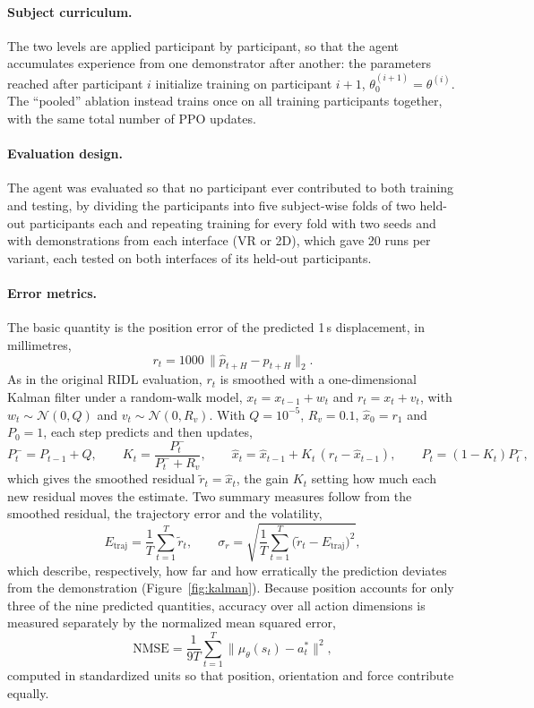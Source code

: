 \documentclass[utf8]{frontiers_suppmat}
\begin{document}
\paragraph*{Subject curriculum.} The two levels are applied participant by participant, so that the agent accumulates experience from one demonstrator after another: the parameters reached after participant $i$ initialize training on participant $i+1$, $\theta^{(i+1)}_0=\theta^{(i)}$. The ``pooled'' ablation instead trains once on all training participants together, with the same total number of PPO updates.

\paragraph*{Evaluation design.} The agent was evaluated so that no participant ever contributed to both training and testing, by dividing the participants into five subject-wise folds of two held-out participants each and repeating training for every fold with two seeds and with demonstrations from each interface (VR or 2D), which gave 20 runs per variant, each tested on both interfaces of its held-out participants.

\paragraph*{Error metrics.} The basic quantity is the position error of the predicted 1\,s displacement, in millimetres,
\begin{equation}\label{eq:err}
r_t=1000\,\big\|\hat p_{t+H}-p_{t+H}\big\|_2 .
\end{equation}
As in the original RIDL evaluation, $r_t$ is smoothed with a one-dimensional Kalman filter under a random-walk model, $x_t=x_{t-1}+w_t$ and $r_t=x_t+v_t$, with $w_t\sim\mathcal N(0,Q)$ and $v_t\sim\mathcal N(0,R_v)$. With $Q=10^{-5}$, $R_v=0.1$, $\hat x_0=r_1$ and $P_0=1$, each step predicts and then updates,
\begin{equation}\label{eq:kalman}
P^-_t=P_{t-1}+Q,\qquad K_t=\frac{P^-_t}{P^-_t+R_v},\qquad \hat x_t=\hat x_{t-1}+K_t\,(r_t-\hat x_{t-1}),\qquad P_t=(1-K_t)P^-_t ,
\end{equation}
which gives the smoothed residual $\tilde r_t=\hat x_t$, the gain $K_t$ setting how much each new residual moves the estimate. Two summary measures follow from the smoothed residual, the trajectory error and the volatility,
\begin{equation}\label{eq:etraj}
E_{\mathrm{traj}}=\frac1T\sum_{t=1}^{T}\tilde r_t,\qquad \sigma_r=\sqrt{\frac1T\sum_{t=1}^{T}\big(\tilde r_t-E_{\mathrm{traj}}\big)^{2}},
\end{equation}
which describe, respectively, how far and how erratically the prediction deviates from the demonstration (Figure~\ref{fig:kalman}). Because position accounts for only three of the nine predicted quantities, accuracy over all action dimensions is measured separately by the normalized mean squared error,
\begin{equation}\label{eq:nmse}
\mathrm{NMSE}=\frac1{9T}\sum_{t=1}^{T}\|\mu_\theta(s_t)-a^*_t\|^{2},
\end{equation}
computed in standardized units so that position, orientation and force contribute equally.
\end{document}
